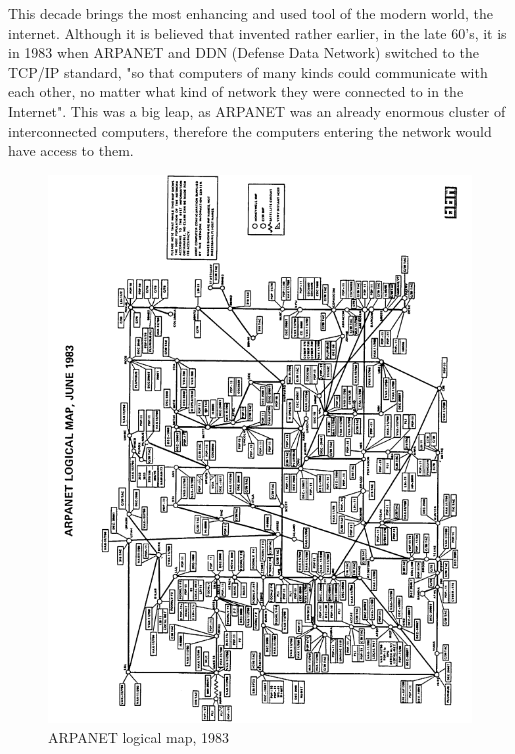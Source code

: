 \par
This decade brings the most enhancing and used tool of the modern world, the internet.
Although it is believed that invented rather earlier, in the late 60's, it is in 1983 when ARPANET and DDN (Defense Data Network) switched to the TCP/IP standard, "so that computers of many kinds could communicate with each other, no matter what kind of network they were connected to in the Internet".\cite{arpanetDdn} This was a big leap, as ARPANET was an already enormous cluster of interconnected computers, therefore the computers entering the network would have access to them.
\begin{figure}[htbp]
    \centering
    \includegraphics[angle=270,scale=0.35]{pictures/arpanet.png}
    \caption{ARPANET logical map, 1983}
    \label{arpanetLogicaMap}
\end{figure}

